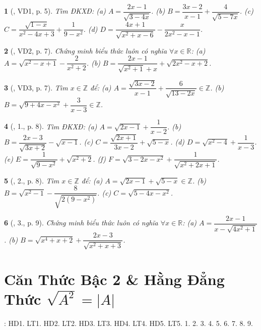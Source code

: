 \documentclass{article}
\newtheorem{baitoan}{}
\begin{document}
\begin{baitoan}[\cite{Thu_Viet_Minh_ptb2}, VD1, p. 5]
	Tìm {\rm ĐKXĐ}: (a) $A = \dfrac{2x - 1}{\sqrt{3 - 4x}}$. (b) $B = \dfrac{3x - 2}{x - 1} + \dfrac{4}{\sqrt{5 - 7x}}$. (c) $C = \dfrac{\sqrt{1 - x}}{x^2 - 4x + 3} + \dfrac{1}{9 - x^2}$. (d) $D = \dfrac{4x + 1}{\sqrt{x^2 + x - 6}} - \dfrac{x}{2x^2 - x - 1}$.
\end{baitoan}

\begin{baitoan}[\cite{Thu_Viet_Minh_ptb2}, VD2, p. 7]
	Chứng minh biểu thức luôn có nghĩa $\forall x\in\mathbb{R}$: (a) $A = \sqrt{x^2 - x + 1} - \dfrac{2}{x^2 + 2}$. (b) $B = \dfrac{2x - 1}{\sqrt{x^2 + 1} + x} + \sqrt{2x^2 - x + 2}$.
\end{baitoan}

\begin{baitoan}[\cite{Thu_Viet_Minh_ptb2}, VD3, p. 7]
	Tìm $x\in\mathbb{Z}$ để: (a) $A = \dfrac{\sqrt{3x - 2}}{x - 1} + \dfrac{6}{\sqrt{13 - 2x}}\in\mathbb{Z}$. (b) $B = \sqrt{9 + 4x - x^2} + \dfrac{3}{x - 3}\in\mathbb{Z}$.
\end{baitoan}

\begin{baitoan}[\cite{Thu_Viet_Minh_ptb2}, 1., p. 8]
	Tìm {\rm ĐKXĐ}: (a) $A = \sqrt{2x - 1} + \dfrac{1}{x - 2}$. (b) $B = \dfrac{2x - 3}{\sqrt{3x + 2}} - \sqrt{x - 1}$. (c) $C = \dfrac{\sqrt{2x + 1}}{3x - 2} + \sqrt{5 - x}$. (d) $D = \sqrt{x^2 - 4} + \dfrac{1}{x - 3}$. (e) $E = \dfrac{1}{\sqrt{9 - x^2}} + \sqrt{x^2 + 2}$. (f) $F = \sqrt{3 - 2x - x^2} + \dfrac{1}{\sqrt{x^2 + 2x + 1}}$.
\end{baitoan}

\begin{baitoan}[\cite{Thu_Viet_Minh_ptb2}, 2., p. 8]
	Tìm $x\in\mathbb{Z}$ để: (a) $A = \sqrt{2x - 1} + \sqrt{5 - x}\in\mathbb{Z}$. (b) $B = \sqrt{x^2 - 1} - \dfrac{8}{\sqrt{2(9 - x^2)}}$. (c) $C = \sqrt{5 - 4x - x^2}$.
\end{baitoan}

\begin{baitoan}[\cite{Thu_Viet_Minh_ptb2}, 3., p. 9]
	Chứng minh biểu thức luôn có nghĩa $\forall x\in\mathbb{R}$: (a) $A = \dfrac{2x - 1}{x - \sqrt{4x^2 + 1}}$. (b) $B = \sqrt{x^4 + x + 2} + \dfrac{2x - 3}{\sqrt{x^2 + x + 3}}$.
\end{baitoan}


\section{Căn Thức Bậc 2 \& Hằng Đẳng Thức $\sqrt{A^2} = |A|$}
\cite[Chap. III, \S2, pp. 55--60]{SGK_Toan_9_Canh_Dieu_tap_1}: HD1. LT1. HD2. LT2. HD3. LT3. HD4. LT4. HD5. LT5. 1. 2. 3. 4. 5. 6. 7. 8. 9.
\end{document}
